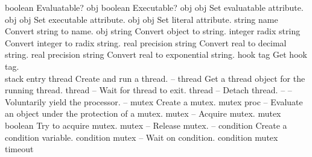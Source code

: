 \begin{longtable}{}
	{boolean}
	{Evaluatable?}
\hline
\optableent
	{obj}
	{{\bf {}}}
	{boolean}
	{Executable?}
\hline
\optableent
	{obj}
	{{\bf {}}}
	{obj}
	{Set evaluatable attribute.}
\hline
\optableent
	{obj}
	{{\bf {}}}
	{obj}
	{Set executable attribute.}
\hline
\optableent
	{obj}
	{{\bf {}}}
	{obj}
	{Set literal attribute.}
\hline
\optableent
	{string}
	{{\bf {}}}
	{name}
	{Convert string to name.}
\hline
\optableent
	{obj}
	{{\bf {}}}
	{string}
	{Convert object to string.}
\hline
\optableent
	{integer radix}
	{{\bf {}}}
	{string}
	{Convert integer to radix string.}
\hline
\optableent
	{real precision}
	{{\bf {}}}
	{string}
	{Convert real to decimal string.}
\hline
\optableent
	{real precision}
	{{\bf {}}}
	{string}
	{Convert real to exponential string.}
\hline
\optableent
	{hook}
	{{\bf {}}}
	{tag}
	{Get hook tag.}
\hline \hline
{} \\
\hline \hline
\optableent
	{stack entry}
	{{\bf {}}}
	{thread}
	{Create and run a thread.}
\hline
\optableent
	{--}
	{{\bf {}}}
	{thread}
	{Get a thread object for the running thread.}
\hline
\optableent
	{thread}
	{{\bf {}}}
	{--}
	{Wait for thread to exit.}
\hline
\optableent
	{thread}
	{{\bf {}}}
	{--}
	{Detach thread.}
\hline
\optableent
	{--}
	{{\bf {}}}
	{--}
	{Voluntarily yield the processor.}
\hline
\optableent
	{--}
	{{\bf {}}}
	{mutex}
	{Create a mutex.}
\hline
\optableent
	{mutex proc}
	{{\bf {}}}
	{--}
	{Evaluate an object under the protection of a mutex.}
\hline
\optableent
	{mutex}
	{{\bf {}}}
	{--}
	{Acquire mutex.}
\hline
\optableent
	{mutex}
	{{\bf {}}}
	{boolean}
	{Try to acquire mutex.}
\hline
\optableent
	{mutex}
	{{\bf {}}}
	{--}
	{Release mutex.}
\hline
\optableent
	{--}
	{{\bf {}}}
	{condition}
	{Create a condition variable.}
\hline
\optableent
	{condition mutex}
	{{\bf {}}}
	{--}
	{Wait on condition.}
\hline
\optableent
	{condition mutex timeout}
	{{\bf {}}}

\end{longtable}
